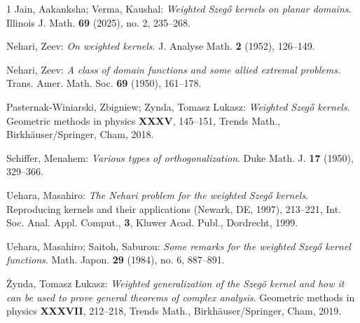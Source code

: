 \documentclass[11pt, reqno]{amsart}
\numberwithin{equation}{section}
\begin{document}
\begin{thebibliography}{1}
		Jain, Aakanksha; Verma, Kaushal: \textit{Weighted Szegő kernels on planar domains}. Illinois J. Math. \textbf{69} (2025), no. 2, 235–268.
		
		Nehari, Zeev:
		\textit{On weighted kernels}. J. Analyse Math. \textbf{2} (1952), 126–149. 
		
		Nehari, Zeev: \textit{A class of domain functions and some allied extremal problems.} 
		Trans. Amer. Math. Soc. \textbf{69} (1950), 161–178.
		
		Pasternak-Winiarski, Zbigniew; Zynda, Tomasz Lukasz:
		\textit{Weighted Szegő kernels}. Geometric methods in physics \textbf{XXXV}, 145–151, Trends Math., Birkhäuser/Springer, Cham, 2018. 
		
%		
%		

		 Schiffer, Menahem:
		\textit{Various types of orthogonalization}. Duke Math. J. \textbf{17} (1950), 329–366.
		
		Uehara, Masahiro: \textit{The Nehari problem for the weighted Szegő kernels}. Reproducing kernels and their applications (Newark, DE, 1997), 213–221, Int. Soc. Anal. Appl. Comput., \textbf{3}, Kluwer Acad. Publ., Dordrecht, 1999. 
		
		Uehara, Masahiro; Saitoh, Saburou:
	\textit{Some remarks for the weighted Szegő kernel functions}. Math. Japon. \textbf{29} (1984), no. 6, 887–891.
		
		Żynda, Tomasz Łukasz:
		\textit{Weighted generalization of the Szegö kernel and how it can be used to prove general theorems of complex analysis}. Geometric methods in physics \textbf{XXXVII}, 212–218, Trends Math., Birkhäuser/Springer, Cham, 2019.
		
		
	\end{thebibliography}
	
\end{document}
